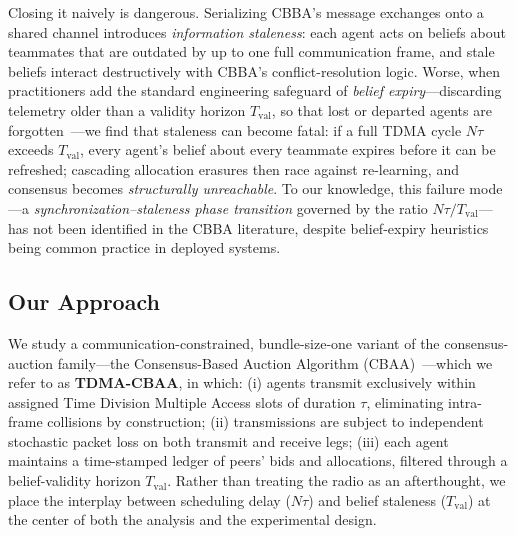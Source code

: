 Closing it naively is dangerous.
Serializing CBBA's message exchanges onto a shared channel introduces \emph{information staleness}: each agent acts on beliefs about teammates that are outdated by up to one full communication frame, and stale beliefs interact destructively with CBBA's conflict-resolution logic.
Worse, when practitioners add the standard engineering safeguard of \emph{belief expiry}---discarding telemetry older than a validity horizon $T_{\mathrm{val}}$, so that lost or departed agents are forgotten~\cite{mott2020communication}---we find that staleness can become fatal:
if a full TDMA cycle $N\tau$ exceeds $T_{\mathrm{val}}$, every agent's belief about every teammate expires before it can be refreshed; cascading allocation erasures then race against re-learning, and consensus becomes \emph{structurally unreachable}.
To our knowledge, this failure mode---a \emph{synchronization--staleness phase transition} governed by the ratio $N\tau / T_{\mathrm{val}}$---has not been identified in the CBBA literature, despite belief-expiry heuristics being common practice in deployed systems.
\subsection{Our Approach}
We study a communication-constrained, bundle-size-one variant of the consensus-auction family---the Consensus-Based Auction Algorithm (CBAA)~\cite{choi2009}---which we refer to as \textbf{TDMA-CBAA}, in which:
(i) agents transmit exclusively within assigned Time Division Multiple Access slots of duration $\tau$, eliminating intra-frame collisions by construction;
(ii) transmissions are subject to independent stochastic packet loss on both transmit and receive legs;
(iii) each agent maintains a time-stamped ledger of peers' bids and allocations, filtered through a belief-validity horizon $T_{\mathrm{val}}$.
Rather than treating the radio as an afterthought, we place the interplay between scheduling delay ($N\tau$) and belief staleness ($T_{\mathrm{val}}$) at the center of both the analysis and the experimental design.

